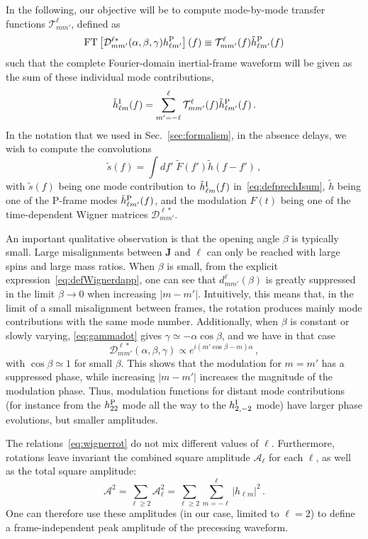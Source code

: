 \documentclass[aps,showpacs,twocolumn,
prd,superscriptaddress,nofootinbib]{revtex4-1}
\newcommand{\be}{\begin{equation}}
\newcommand{\ee}{\end{equation}}
\newcommand\calT{{\mathcal{T}}}
\newcommand\calD{{\mathcal{D}}}
\newcommand\calA{{\mathcal{A}}}
\newcommand{\jgb}[1]{{\color{DarkGreen} #1}}
\begin{document}
In the following, our objective will be to compute mode-by-mode transfer functions $\calT^{\ell}_{mm'}$, defined as
\be\label{eq:defprectransfer}
	\mathrm{FT} \left[ \calD^{\ell *}_{mm'} (\alpha,\beta,\gamma) h_{\ell m'}^{\rm P} \right] (f) \equiv \calT^{\ell}_{mm'}(f) \tilde{h}_{\ell m'}^{\rm P} (f)
\ee
such that the complete Fourier-domain inertial-frame waveform will be given as the sum of these individual mode contributions,
\be\label{eq:defprechIsum}
	\tilde{h}_{\ell m}^{\rm I} (f) = \sum\limits_{m'=-\ell}^{\ell} \calT^{\ell}_{mm'}(f) \tilde{h}_{\ell m'}^{\rm P} (f) \,.
\ee
In the notation that we used in Sec.~\ref{sec:formalism}, in the absence delays, we wish to compute the convolutions
\be\label{eq:precconvolution}
	\tilde{s} (f) = \int df' \; \tilde{F}(f') \tilde{h} (f-f') \,,
\ee
with $\tilde{s}(f)$ being one mode contribution to $\tilde{h}_{\ell m}^{\rm I} (f)$ in~\eqref{eq:defprechIsum}, $\tilde{h}$ being one of the P-frame modes $\tilde{h}_{\ell m'}^{\rm P} (f)$, and the modulation $F(t)$ being one of the time-dependent Wigner matrices $\calD^{\ell *}_{mm'}$.

\jgb{An important qualitative observation is that the opening angle $\beta$ is typically small. Large misalignments between $\bm{J}$ and $\bm{\ell}$ can only be reached with large spins and large mass ratios. When $\beta$ is small,} from the explicit expression~\eqref{eq:defWignerdapp}, one can see that $d^{\ell}_{mm'}(\beta)$ is greatly suppressed in the limit $\beta \rightarrow 0$ when increasing $|m-m'|$. Intuitively, this means that, in the limit of a small misalignment between frames, the rotation produces mainly mode contributions with the same mode number. Additionally, when $\beta$ is constant or slowly varying, \eqref{eq:gammadot} gives $\gamma \simeq - \alpha \cos\beta$, and we have in that case
\be\label{eq:wignerphasesimpleprec}
	\calD^{\ell *}_{mm'} (\alpha, \beta, \gamma) \propto e^{i(m' \cos\beta - m) \alpha} \,,
\ee
with $\cos\beta \simeq 1$ for small $\beta$. This shows that the modulation for $m=m'$ has a suppressed phase, while increasing $|m-m'|$ increases the magnitude of the modulation phase. Thus, modulation functions for distant mode contributions (for instance from the $h^{\rm P}_{22}$ mode all the way to the $h^{\rm I}_{2,-2}$ mode) have larger phase evolutions, but smaller amplitudes.

The relations~\eqref{eq:wignerrot} do not mix different values of $\ell$. Furthermore, rotations leave invariant the combined square amplitude $\calA_{\ell}$ for each $\ell$, as well as the total square amplitude:
\be\label{eq:defsumamplitude}
	\calA^{2} = \sum\limits_{\ell \geq 2}\calA_{\ell}^{2} = \sum\limits_{\ell \geq 2}\sum\limits_{m=-\ell}^{\ell} |h_{\ell m}|^{2} \,.
\ee
One can therefore use these amplitudes (in our case, limited to $\ell = 2$) to define a frame-independent peak amplitude of the precessing waveform.
\end{document}
